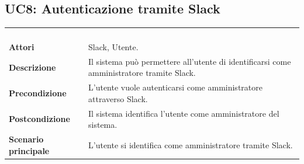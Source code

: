 \newpage
\subsection{UC8: Autenticazione tramite Slack}
\label{UC8}
\begin{longtable}{l|p{10cm}}
\rowcolor[gray]{0.8} \multicolumn{2}{c}{} \\
\rowcolor[gray]{0.8} \multicolumn{2}{c}{\textbf{UC8 - Autenticazione tramite \gl{Slack}}} \\
\rowcolor[gray]{0.8} \multicolumn{2}{c}{} \\
\hline
&\\
\textbf{Attori} & Slack, Utente.\\[7pt]
\textbf{Descrizione} & Il sistema può permettere all'utente di identificarsi come amministratore tramite Slack.\\[7pt]
\textbf{Precondizione} & L'utente vuole autenticarsi come amministratore attraverso Slack.\\[7pt]
\textbf{Postcondizione} & Il sistema identifica l'utente come amministratore del sistema.\\[7pt]
\textbf{Scenario principale} &L'utente si identifica come amministratore tramite Slack.\\[7pt]\hline
\end{longtable}

